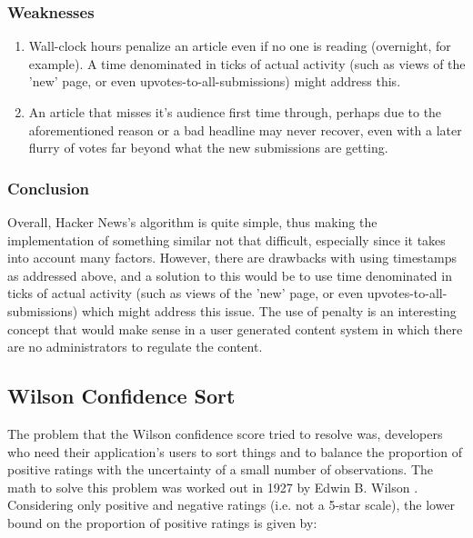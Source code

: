 
\subsubsection {Weaknesses}
\begin{enumerate}
  \item Wall-clock hours penalize an article even if no one is reading (overnight, for example). A time denominated in ticks of actual activity (such as views of the 'new' page, or even upvotes-to-all-submissions) might address this.
  \item An article that misses it's audience first time through, perhaps due to the aforementioned reason or a bad headline may never recover, even with a later flurry of votes far beyond what the new submissions are getting.
\end{enumerate}

\subsubsection {Conclusion}
Overall, Hacker News's algorithm is quite simple, thus making the implementation of something similar not that difficult, especially since it takes into account many factors. However, there are drawbacks with using timestamps as addressed above, and a solution to this would be to use time denominated in ticks of actual activity (such as views of the 'new' page, or even upvotes-to-all-submissions) which might address this issue.
The use of penalty is an interesting concept that would make sense in a user generated content system in which there are no administrators to regulate the content.

\subsection {Wilson Confidence Sort}
The problem that the Wilson confidence score tried to resolve was, developers who need their application's users to sort things and to balance the proportion of positive ratings with the uncertainty of a small number of observations. The math to solve this problem was worked out in 1927 by Edwin B. Wilson \cite{miller_2009_how}. Considering only positive and negative ratings (i.e. not a 5-star scale), the lower bound on the proportion of positive ratings is given by:

